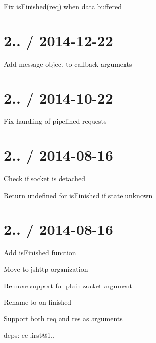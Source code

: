 
\begin{DoxyItemize}
\item Fix {\ttfamily is\+Finished(req)} when data buffered
\end{DoxyItemize}

\section*{2.. / 2014-\/12-\/22 }


\begin{DoxyItemize}
\item Add message object to callback arguments
\end{DoxyItemize}

\section*{2.. / 2014-\/10-\/22 }


\begin{DoxyItemize}
\item Fix handling of pipelined requests
\end{DoxyItemize}

\section*{2.. / 2014-\/08-\/16 }


\begin{DoxyItemize}
\item Check if {\ttfamily socket} is detached
\item Return {\ttfamily undefined} for {\ttfamily is\+Finished} if state unknown
\end{DoxyItemize}

\section*{2.. / 2014-\/08-\/16 }


\begin{DoxyItemize}
\item Add {\ttfamily is\+Finished} function
\item Move to {\ttfamily jshttp} organization
\item Remove support for plain socket argument
\item Rename to {\ttfamily on-\/finished}
\item Support both {\ttfamily req} and {\ttfamily res} as arguments
\item deps\+: ee-\/first@1..
\end{DoxyItemize}

